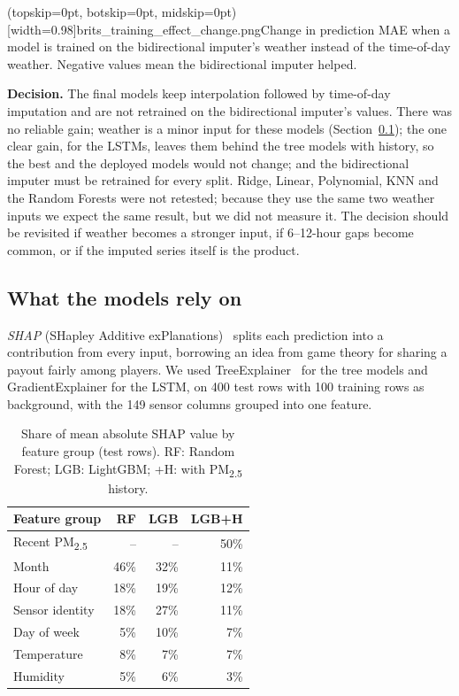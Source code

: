 \documentclass{ieeeaccess}
\newcommand{\pmtwo}{PM\textsubscript{2.5}}
\begin{document}
\Figure[t!](topskip=0pt, botskip=0pt, midskip=0pt)[width=0.98\columnwidth]{brits_training_effect_change.png}{Change in prediction MAE when a model is trained on the bidirectional imputer's weather instead of the time-of-day weather. Negative values mean the bidirectional imputer helped.\label{fig:effect}}

\textbf{Decision.} The final models keep interpolation followed by time-of-day imputation and are not retrained on the bidirectional imputer's values. There was no reliable gain; weather is a minor input for these models (Section~\ref{sec:shap}); the one clear gain, for the LSTMs, leaves them behind the tree models with history, so the best and the deployed models would not change; and the bidirectional imputer must be retrained for every split. Ridge, Linear, Polynomial, KNN and the Random Forests were not retested; because they use the same two weather inputs we expect the same result, but we did not measure it. The decision should be revisited if weather becomes a stronger input, if 6--12-hour gaps become common, or if the imputed series itself is the product.

\subsection{What the models rely on}
\label{sec:shap}
\emph{SHAP} (SHapley Additive exPlanations)~\cite{lundberg2017} splits each prediction into a contribution from every input, borrowing an idea from game theory for sharing a payout fairly among players. We used TreeExplainer~\cite{lundberg2020} for the tree models and GradientExplainer for the LSTM, on 400 test rows with 100 training rows as background, with the 149 sensor columns grouped into one feature.

\begin{table}[t]
\caption{Share of mean absolute SHAP value by feature group (test rows). RF: Random Forest; LGB: LightGBM; +H: with \pmtwo{} history.}
\label{tab:shap}
\centering
\begin{tabular}{lrrr}
\toprule
Feature group & RF & LGB & LGB+H \\
\midrule
Recent \pmtwo{} & -- & -- & 50\% \\
Month & 46\% & 32\% & 11\% \\
Hour of day & 18\% & 19\% & 12\% \\
Sensor identity & 18\% & 27\% & 11\% \\
Day of week & 5\% & 10\% & 7\% \\
Temperature & 8\% & 7\% & 7\% \\
Humidity & 5\% & 6\% & 3\% \\
\bottomrule
\end{tabular}
\end{table}
\end{document}
